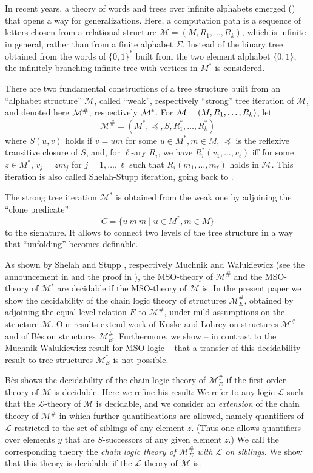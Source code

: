 \documentclass[copyright,creativecommons]{eptcs}
\theoremstyle{plain}
\theoremstyle{nonumberplain}
\newcommand{\m}{\ensuremath{\mathcal{M}}}
\newcommand{\el}{\ensuremath{\mathcal{L}}}
\newcommand{\Mweak}{\ensuremath{\m^{\#}}}
\newcommand{\MweakE}{\ensuremath{\m^{\#}_E}}
\newcommand{\Mstrong}{\ensuremath{\m^*}}
\newcommand{\MstrongE}{\ensuremath{\m^*_E}}
\begin{document}
In recent years, a theory of words and trees over infinite alphabets emerged
(\cite{nsv04,bmssd,cg09}) that opens a way for generalizations. 
Here,  a computation 
path is a sequence of letters chosen from a relational structure 
$\m = (M, R_1, \ldots, R_k)$, which is infinite in general, rather than 
from a finite alphabet $\Sigma$. Instead of the binary tree obtained from 
the words of $\{0,1\}^*$ built from the two element alphabet $\{0,1\}$, 
the infinitely branching infinite tree with vertices in $M^*$ is considered.  

There are two fundamental constructions of a tree structure built from an ``alphabet structure''
$\m$, called ``weak'', respectively ``strong'' tree iteration of 
$\m$, and denoted here ${\cal M}^\#$, respectively ${\cal M}^*$. 
For ${\cal M} = (M, R_1, \ldots, R_k)$, let
$$\Mweak = (M^*, \preceq, S, R^*_1, \ldots, R^*_k)$$
where $S(u,v)$ holds if $v = um$ for some $u \in M^*, m \in M$, 
$\preceq$ is the reflexive transitive closure of $S$, and, for $\ell$-ary $R_i$, we have  
$R^*_i(v_1, \ldots, v_\ell)$ iff for some $z \in M^*$, $v_j = z m_j$ for $j = 1, \ldots, \ell$ such
that $R_i(m_1, \ldots, m_\ell)$ holds in $\m$. 
This iteration is also called Shelah-Stupp iteration, going back 
to \cite{she75,stu75}. 

The strong tree iteration $\Mstrong$ is obtained from the weak one by adjoining 
the ``clone predicate'' 
$$C = \{u \  m \ m \mid u \in M^* , m \in M\}$$ 
to the 
signature. It allows to connect two levels of the tree structure in a way that 
``unfolding'' becomes definable. 

As shown by Shelah and Stupp \cite{she75,stu75}, respectively Muchnik and Walukiewicz (see the 
announcement in \cite{sem84} and the proof in \cite{wal02}), the MSO-theory 
of $\Mweak$ and the MSO-theory of $\Mstrong$ are decidable if the 
MSO-theory of $\m$ is. In the present paper we show the decidability of the 
chain logic theory of structures $\MweakE$, 
obtained by adjoining the equal level relation $E$ to $\Mweak$, 
under mild assumptions on the structure $\m$.   
Our results extend work of Kuske and Lohrey \cite{kl06} on structures $\Mweak$
and of B{\`e}s \cite{bes08} on structures $\MweakE$. Furthermore, we show -- in contrast 
to the Muchnik-Walukiewicz result for MSO-logic --  that a transfer 
of this decidability result to tree structures $\MstrongE$ is not possible.

B{\`e}s shows the decidability of 
the chain logic theory of $\MweakE$ if the first-order theory of $\m$ is
decidable. Here we refine his result: We refer to any logic $\el$ 
such that the $\el$-theory of $\m$ is decidable, and we consider an 
{\em extension} of the chain theory of $\Mweak$ in which further quantifications 
are allowed, namely quantifiers of $\el$ restricted to the set of siblings of 
any element $z$. (Thus one allows quantifiers over elements $y$ that are $S$-successors 
of any given element $z$.) We call the corresponding theory the {\em chain logic theory 
of $\MweakE$ with $\el$ on siblings}. We show that this theory is decidable 
if the $\el$-theory of $\m$ is. 
\end{document}
